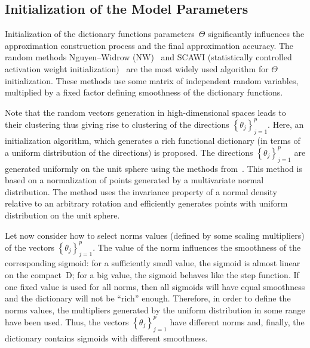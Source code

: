 \begin{multicols}{2}
\subsection{Initialization of the Model Parameters}
\label{init}

\noindent
Initialization of the dictionary functions parameters~$\Theta$ significantly 
influences the approximation construction process and the final approximation accuracy.
The random methods Nguyen--Widrow (NW)~\cite{initNW} and SCAWI
(statistically controlled activation weight initialization)~\cite{initSCAWI}
are the most widely used algorithm for $\Theta$ initialization.
These methods use some matrix of independent random variables,
   multiplied by a fixed factor defining smoothness of the dictionary functions.
   {
   
   }
   
Note that the random vectors generation in high-dimensional spaces
   leads to their clustering thus giving rise to clustering of the directions 
   $\left\{\theta_j\right\}_{j = 1}^p$.
Here, an initialization algorithm, which
generates a rich functional dictionary    
(in terms of a uniform distribution of the directions) is proposed.
The directions $\left\{\theta_j\right\}_{j = 1}^p $ are generated
uniformly on the unit 
sphere using the methods from~\cite{SpherRnd}. 
This method is based on a normalization of points generated by a multivariate normal distribution.
The method uses the invariance property of a normal density relative 
to an arbitrary rotation and efficiently generates points with uniform 
distribution on the unit sphere.
   {
   
   }

Let now consider how to select norms values (defined by some scaling multipliers) 
of the vectors
$\left\{\theta_j\right\}_{j=1}^p$.
The value of the norm influences the smoothness of the corresponding sigmoid:
for a sufficiently small value, the sigmoid is almost linear on the compact~D;  
for a big value, the sigmoid behaves like the step function.
If one fixed value is used for all norms, then all sigmoids will have equal smoothness 
and the dictionary will not be ``rich'' enough.
Therefore, in order to define the norms values, the multipliers generated 
by the uniform distribution in some range have been used. Thus, the vectors 
$\left\{\theta_j\right\}_{j=1}^p$ have different norms and, finally, the 
dictionary contains sigmoids with different smoothness.
{

}


\end{multicols}
